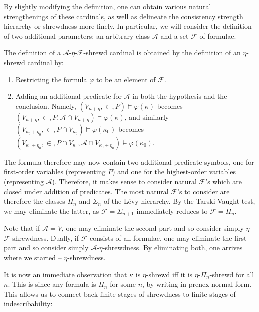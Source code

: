 \documentclass{article}
\theoremstyle{definition}
\theoremstyle{plain}
\theoremstyle{plain}
\theoremstyle{plain}
\theoremstyle{plain}
\theoremstyle{remark}
\theoremstyle{remark}
\theoremstyle{remark}
\theoremstyle{plain}
\theoremstyle{plain}
\theoremstyle{plain}
\begin{document}
By slightly modifying the definition, one can obtain various natural strengthenings of these cardinals, as well as delineate the consistency strength hierarchy or shrewdness more finely. In particular, we will consider the definition of two additional parameters: an arbitrary class $\mathcal{A}$ and a set $\mathcal{F}$ of formulae.

The definition of a $\mathcal{A}$-$\eta$-$\mathcal{F}$-shrewd cardinal is obtained by the definition of an $\eta$-shrewd cardinal by:

\begin{enumerate}
    \item Restricting the formula $\varphi$ to be an element of $\mathcal{F}$.
    \item Adding an additional predicate for $\mathcal{A}$ in both the hypothesis and the conclusion. Namely, $(V_{\kappa+\eta}, \in, P) \models \varphi(\kappa)$ becomes $(V_{\kappa+\eta}, \in, P, \mathcal{A} \cap V_{\kappa+\eta}) \models \varphi(\kappa)$, and similarly $(V_{\kappa_0+\eta_0}, \in, P \cap V_{\kappa_0}) \models \varphi(\kappa_0)$ becomes $(V_{\kappa_0+\eta_0}, \in, P \cap V_{\kappa_0}, \mathcal{A} \cap V_{\kappa_0+\eta_0}) \models \varphi(\kappa_0)$.
\end{enumerate}

The formula therefore may now contain two additional predicate symbols, one for first-order variables (representing $P$) and one for the highest-order variables (representing $\mathcal{A}$). Therefore, it makes sense to consider natural $\mathcal{F}$'s which are closed under addition of predicates. The most natural $\mathcal{F}$'s to consider are therefore the classes $\Pi_n$ and $\Sigma_n$ of the Lévy hierarchy. By the Tarski-Vaught test, we may eliminate the latter, as $\mathcal{F} = \Sigma_{n+1}$ immediately reduces to $\mathcal{F} = \Pi_n$.

Note that if $\mathcal{A} = V$, one may eliminate the second part and so consider simply $\eta$-$\mathcal{F}$-shrewdness. Dually, if $\mathcal{F}$ consists of all formulae, one may eliminate the first part and so consider simply $\mathcal{A}$-$\eta$-shrewdness. By eliminating both, one arrives where we started -- $\eta$-shrewdness.

It is now an immediate observation that $\kappa$ is $\eta$-shrewd iff it is $\eta$-$\Pi_n$-shrewd for all $n$. This is since any formula is $\Pi_n$ for some $n$, by writing in prenex normal form. This allows us to connect back finite stages of shrewdness to finite stages of indescribability:
\end{document}
